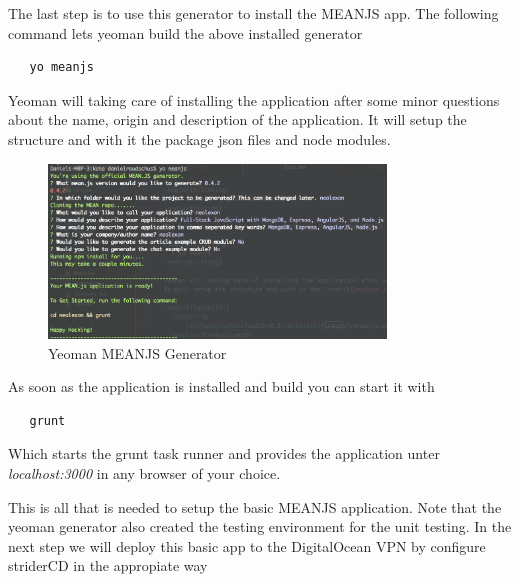 The last step is to use this generator to install the MEANJS app. The following command lets yeoman build the above installed generator

\begin{lstlisting}
   yo meanjs
\end{lstlisting}

Yeoman will taking care of installing the application after some minor questions about the name, origin and description of the application.
It will setup the structure and with it the package json files and node modules.

\begin{figure}[h!]
  \centering
      \includegraphics[width=0.8\textwidth]{images/yomean.png}
  \caption{Yeoman MEANJS Generator}
\end{figure}

As soon as the application is installed and build you can start it with

\begin{lstlisting}
   grunt
\end{lstlisting}

Which starts the grunt task runner and provides the application unter \textit{localhost:3000} in any browser of your choice.

This is all that is needed to setup the basic MEANJS application. Note that the yeoman generator also created the testing environment
for the unit testing. In the next step we will deploy this basic app to the DigitalOcean VPN by configure striderCD in the appropiate way

